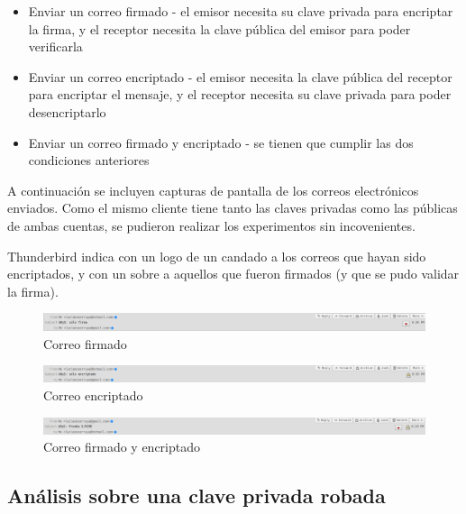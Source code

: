 \begin{itemize}
    \item Enviar un correo firmado - el emisor necesita su clave privada para encriptar la firma, y el receptor necesita la clave pública del emisor para poder verificarla
    \item Enviar un correo encriptado - el emisor necesita la clave pública del receptor para encriptar el mensaje, y el receptor necesita su clave privada para poder desencriptarlo
    \item Enviar un correo firmado y encriptado - se tienen que cumplir las dos condiciones anteriores
\end{itemize}

A continuación se incluyen capturas de pantalla de los correos electrónicos enviados. Como el mismo cliente tiene tanto las claves privadas como las públicas de ambas cuentas, se pudieron realizar los experimentos sin incovenientes.

Thunderbird indica con un logo de un candado a los correos que hayan sido encriptados, y con un sobre a aquellos que fueron firmados (y que se pudo validar la firma).

\begin{figure}[h]
    \centering
    \includegraphics[width=\linewidth]{images/arys-tp3-correo-firmado.png}
    \caption*{Correo firmado}
\end{figure}

\begin{figure}[h]
    \centering
    \includegraphics[width=\linewidth]{images/arys-tp3-correo-encriptado.png}
    \caption*{Correo encriptado}
\end{figure}

\begin{figure}[h]
    \centering
    \includegraphics[width=\linewidth]{images/arys-tp3-correo-firmado-encriptado.png}
    \caption*{Correo firmado y encriptado}
\end{figure}



\subsection{Análisis sobre una clave privada robada}

